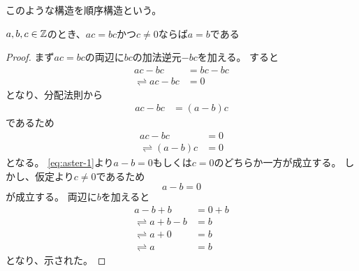 \documentclass[uplatex, 11pt, a4j, dvipdfmx]{jsarticle}
\begin{document}
  このような構造を順序構造という。

  \begin{screen}
    \begin{prop}
      $a, b, c \in \mathbb{Z}$のとき、$a c = b c$かつ$c \neq 0$ならば$a = b$である
    \end{prop}
  \end{screen}
  \begin{proof}
    まず$a c = b c$の両辺に$b c$の加法逆元$-bc$を加える。
    すると
    \begin{equation} \begin{aligned}
                          a c - b c &= b c - b c \\
      \rightleftharpoons  a c - b c &= 0
    \end{aligned} \end{equation}
    となり、分配法則から
    \begin{equation} \begin{aligned}
      a c - b c &= (a - b) c
    \end{aligned} \end{equation}
    であるため
    \begin{equation} \begin{aligned}
                          a c - b c &= 0 \\
      \rightleftharpoons  (a - b) c &= 0  \label{eq:aster-1}
    \end{aligned} \end{equation}
    となる。
    \cref{eq:aster-1}より$a - b = 0$もしくは$c = 0$のどちらか一方が成立する。
    しかし、仮定より$c \neq 0$であるため
    \begin{equation}
      a - b = 0
    \end{equation}
    が成立する。
    両辺に$b$を加えると
    \begin{equation} \begin{aligned}
                          a - b + b &= 0 + b \\
      \rightleftharpoons  a + b - b &= b \\
      \rightleftharpoons  a + 0 &= b \\
      \rightleftharpoons  a &= b
    \end{aligned} \end{equation}
    となり、示された。
  \end{proof}
\end{document}
